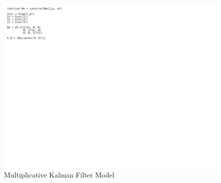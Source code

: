 \begin{figure}[H]
    \centering
    \captionsetup{ justification = centering }
    \includegraphics[trim={0cm 16cm 15cm 0cm},clip,width = 15cm]{Images/PS7/kalmanFilter-09.png}
    \caption{Multiplicative Kalman Filter Model}
    \label{fig:kf_model}
\end{figure}